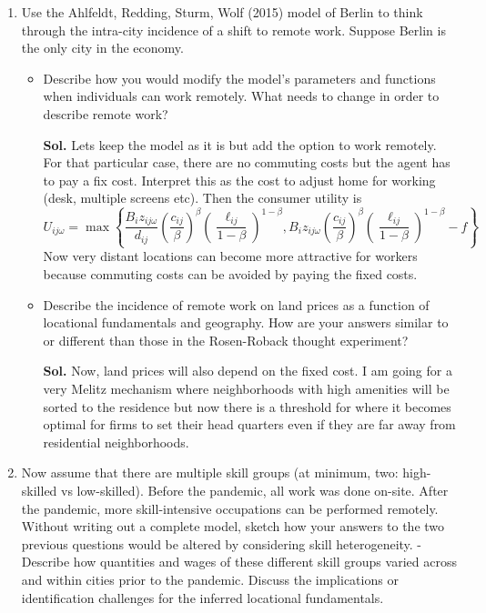 \documentclass[12pt,oneside,reqno]{amsart}
\begin{document}
\begin{enumerate}[label=\textbf{\roman*.}]
\item Use the Ahlfeldt, Redding, Sturm, Wolf (2015) model of Berlin to think through the intra-city incidence of a shift to remote work. Suppose Berlin is the only city in the economy.
\begin{itemize}
    \item Describe how you would modify the model's parameters and functions when individuals can work remotely. What needs to change in order to describe remote work?
    \item[\textbf{Sol.}] Lets keep the model as it is but add the option to work remotely. For that particular case, there are no commuting costs but the agent has to pay a fix cost. Interpret this as the cost to adjust home for working (desk, multiple screens etc). Then the consumer utility is
    \begin{equation*}
        U_{ij\omega} = \max\left\{\frac{B_iz_{ij\omega}}{d_{ij}}\left(\frac{c_{ij}}{\beta}\right)^{\beta}\left(\frac{\ell_{ij}}{1-\beta}\right)^{1-\beta},B_iz_{ij\omega}\left(\frac{c_{ij}}{\beta}\right)^{\beta}\left(\frac{\ell_{ij}}{1-\beta}\right)^{1-\beta}-f\right\}
    \end{equation*}
    Now very distant locations can become more attractive for workers because commuting costs can be avoided by paying the fixed costs. 
    \item Describe the incidence of remote work on land prices as a function of locational fundamentals and geography. How are your answers similar to or different than those in the Rosen-Roback thought experiment?
    \item[\textbf{Sol.}] Now, land prices will also depend on the fixed cost. I am going for a very Melitz mechanism where neighborhoods with high amenities will be sorted to the residence but now there is a threshold for where it becomes optimal for firms to set their head quarters even if they are far away from residential neighborhoods. 
\end{itemize}
\item Now assume that there are multiple skill groups (at minimum, two: high-skilled vs low-skilled). Before the pandemic, all work was done on-site. After the pandemic, more skill-intensive occupations can be performed remotely. Without writing out a complete model, sketch how your answers to the two previous questions would be altered by considering skill heterogeneity. - Describe how quantities and wages of these different skill groups varied across and within cities prior to the pandemic. Discuss the implications or identification challenges for the inferred locational fundamentals.

\end{enumerate}
\end{document}
